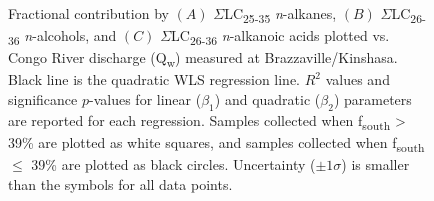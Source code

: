 \begin{figure}[p]
	\caption[Correlation between compound class contribution and discharge]{Fractional contribution by $(A)$ $\Sigma$LC\textsubscript{25-35} \textit{n}-alkanes, $(B)$ $\Sigma$LC\textsubscript{26-36} \textit{n}-alcohols, and $(C)$ $\Sigma$LC\textsubscript{26-36} \textit{n}-alkanoic acids plotted vs. Congo River discharge (Q\textsubscript{w}) measured at Brazzaville/Kinshasa. Black line is the quadratic WLS regression line. $R^2$ values and significance $p$-values for linear ($\beta_1$) and quadratic ($\beta_2$) parameters are reported for each regression. Samples collected when f\textsubscript{south} > 39\% are plotted as white squares, and samples collected when f\textsubscript{south} $\leq$ 39\% are plotted as black circles. Uncertainty ($\pm 1 \sigma$) is smaller than the symbols for all data points.}
	\label{Ch4Fig:10} 
\end{figure}

